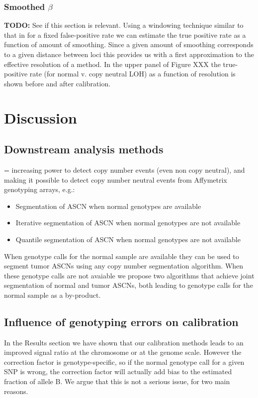 \documentclass[10pt]{bmc_article}
\newenvironment{bmcformat}{\fussy\setboolean{publ}{true}}{\fussy}
\newenvironment{TODO}{\color{red}\textbf{TODO:}}{}
\begin{document}
\begin{bmcformat}
\subsubsection*{Smoothed $\beta$}
\begin{TODO}
  See if this section is relevant.
\end{TODO}
Using a windowing technique similar to that in \cite{BengtssonH_etal_2009b,BengtssonH_etal_2008a} for a fixed false-positive rate we can estimate the true positive rate as a function of amount of smoothing. Since a given amount of smoothing corresponds to a given distance between loci this provides us with a first approximation to the effective resolution of a method. In the upper panel of Figure XXX the true-positive rate (for normal v. copy neutral LOH) as a function of resolution is shown before and after calibration.

\section*{Discussion}

\subsection*{Downstream analysis methods}
= increasing power to detect copy number events (even non copy neutral), and making it possible to detect copy number neutral events from Affymetrix genotyping arrays, e.g.: 
\begin{itemize}
\item Segmentation of ASCN when normal genotypes are available
\item Iterative segmentation of ASCN when normal genotypes are not available
\item Quantile segmentation of ASCN when normal genotypes are not available
\end{itemize}

 When genotype calls for the normal sample are available they can be used to segment tumor ASCNs using any copy number segmentation algorithm. When these genotype calls are not avaiable we propose two algorithms that achieve joint segmentation of normal and tumor ASCNs, both leading to genotype calls for the normal sample as a by-product.\\

\subsection*{Influence of genotyping errors on calibration}
In the Results section we have shown that our calibration methods leads to an improved signal ratio at the chromosome or at the genome scale. However the correction factor is genotype-specific, so if the normal genotype call for a given SNP is wrong, the correction factor will actually add bias to the estimated fraction of allele B. We argue that this is not a serious issue, for two main reasons.


\end{bmcformat}
\end{document}
